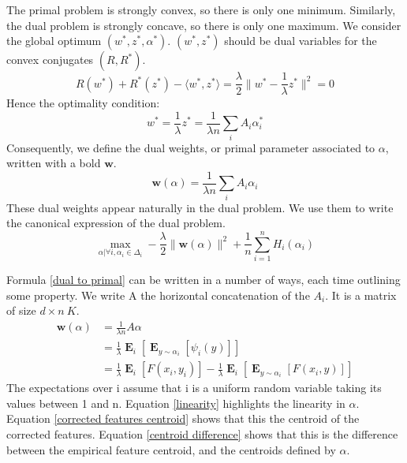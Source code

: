 \documentclass{article}
\DeclareMathOperator{\1}{\mathbb{1}}
\DeclareMathOperator{\E}{\mathbf{E}}
\begin{document}
The primal problem is strongly convex, so there is only one minimum.
Similarly, the dual problem is strongly concave, so there is only one maximum.
We consider the global optimum $(w^*,z^*,\alpha^*)$.
$(w^*,z^*)$ should be dual variables for the convex conjugates $(R, R^*)$.
\begin{equation*}
	R(w^*) + R^*(z^*) - \langle w^*, z^* \rangle = \frac{\lambda}{2} \| w^* - \frac{1}{\lambda} z^* \|^2 = 0
\end{equation*}
Hence the optimality condition:
\begin{equation*}
	w^* = 	\frac{1}{\lambda} z^* =  \frac{1}{\lambda n} \sum_i A_i \alpha_i^*
\end{equation*}
Consequently, we define the dual weights, or primal parameter associated to $\alpha$, written with a bold $\bm w$.
\begin{equation}
	\label{dual to primal}
	\bm w(\alpha) =   \frac{1}{\lambda n} \sum_i A_i \alpha_i
\end{equation}
These dual weights appear naturally in the dual problem. We use them to write the canonical expression of the dual problem.
\begin{equation}
	\label{dual problem}
	\max_{\alpha | \forall i, \alpha_i \in \Delta_i} -\frac{\lambda}{2} \| \bm w(\alpha) \|^2 + \frac{1}{n} \sum_{i=1}^n H_i(\alpha_i)
\end{equation}

Formula \ref{dual to primal} can be written in a number of ways, each time outlining some property.
We write A the horizontal concatenation of the $A_i$.
It is a matrix of size $d \times n\ K$.
\begin{align}
	\bm w(\alpha) & = \frac{1}{\lambda n} A \alpha \label{linearity} \\
	 & = \frac{1}{\lambda} \E_{i} [ \E_{y \sim \alpha_i} [\psi_i(y)]] \label{corrected features centroid} \\
	 & =   \frac{1}{\lambda} \E_{i} [F(x_i, y_i)] - \frac{1}{\lambda} \E_{i} [ \E_{y \sim \alpha_i} [F(x_i, y)]]
	 \label{centroid difference}
\end{align}
The expectations over i assume that i is a uniform random variable taking its values between 1 and n. 
Equation \ref{linearity} highlights the linearity in $\alpha$. Equation \ref{corrected features centroid} shows that this the centroid of the corrected features. Equation \ref{centroid difference} shows that this is the difference between the empirical feature centroid, and the centroids defined by $\alpha$.
\end{document}
